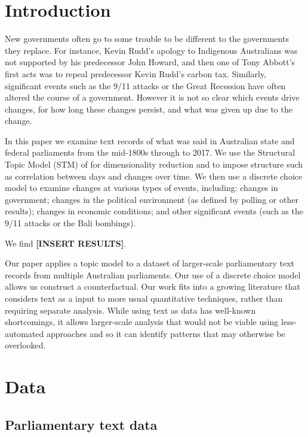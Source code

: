 \documentclass[12pt,]{article}
\theoremstyle{definition}
\theoremstyle{definition}
\theoremstyle{definition}
\theoremstyle{remark}
\begin{document}
\vskip 6.5pt


\noindent  \section{Introduction}\label{introduction}

New governments often go to some trouble to be different to the
governments they replace. For instance, Kevin Rudd's apology to
Indigenous Australians was not supported by his predecessor John Howard,
and then one of Tony Abbott's first acts was to repeal predecessor Kevin
Rudd's carbon tax. Similarly, significant events such as the 9/11
attacks or the Great Recession have often altered the course of a
government. However it is not so clear which events drive changes, for
how long these changes persist, and what was given up due to the change.

In this paper we examine text records of what was said in Australian
state and federal parliaments from the mid-1800s through to 2017. We use
the Structural Topic Model (STM) of \citet{RobertsStewartAiroldi2016}
for dimensionality reduction and to impose structure such as correlation
between days and changes over time. We then use a discrete choice model
to examine changes at various types of events, including: changes in
government; changes in the political environment (as defined by polling
or other results); changes in economic conditions; and other significant
events (such as the 9/11 attacks or the Bali bombings).

We find \textbf{{[}INSERT RESULTS{]}}.

Our paper applies a topic model to a dataset of larger-scale
parliamentary text records from multiple Australian parliaments. Our use
of a discrete choice model allows us construct a counterfactual. Our
work fits into a growing literature that considers text as a input to
more usual quantitative techniques, rather than requiring separate
analysis. While using text as data has well-known shortcomings, it
allows larger-scale analysis that would not be viable using
less-automated approaches and so it can identify patterns that may
otherwise be overlooked.

\section{Data}\label{data}

\subsection{Parliamentary text data}\label{parliamentary-text-data}
\end{document}
